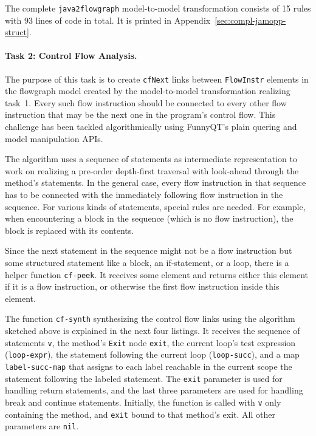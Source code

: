 \documentclass[submission]{eptcs}
\begin{document}
The complete \verb|java2flowgraph| model-to-model transformation consists of 15
rules with 93 lines of code in total.  It is printed in
Appendix~\ref{sec:compl-jamopp-struct}.


\paragraph{Task 2: Control Flow Analysis.}
\label{sec:task-2}

The purpose of this task is to create \verb|cfNext| links between
\verb|FlowInstr| elements in the flowgraph model created by the model-to-model
transformation realizing task~1.  Every such flow instruction should be
connected to every other flow instruction that may be the next one in the
program's control flow.  This challenge has been tackled algorithmically using
FunnyQT's plain quering and model manipulation APIs.

The algorithm uses a sequence of statements as intermediate representation to
work on realizing a pre-order depth-first traversal with look-ahead through the
method's statements.  In the general case, every flow instruction in that
sequence has to be connected with the immediately following flow instruction in
the sequence.  For various kinds of statements, special rules are needed.  For
example, when encountering a block in the sequence (which is no flow
instruction), the block is replaced with its contents.

Since the next statement in the sequence might not be a flow instruction but
some structured statement like a block, an if-statement, or a loop, there is a
helper function \verb|cf-peek|.  It receives some element and returns either
this element if it is a flow instruction, or otherwise the first flow
instruction inside this element.

The function \verb|cf-synth| synthesizing the control flow links using the
algorithm sketched above is explained in the next four listings.  It receives
the sequence of statements \verb|v|, the method's \verb|Exit| node \verb|exit|,
the current loop's test expression (\verb|loop-expr|), the statement following
the current loop (\verb|loop-succ|), and a map \verb|label-succ-map| that
assigns to each label reachable in the current scope the statement following
the labeled statement.  The \verb|exit| parameter is used for handling return
statements, and the last three parameters are used for handling break and
continue statements.  Initially, the function is called with \verb|v| only
containing the method, and \verb|exit| bound to that method's exit.  All other
parameters are \verb|nil|.
\end{document}
